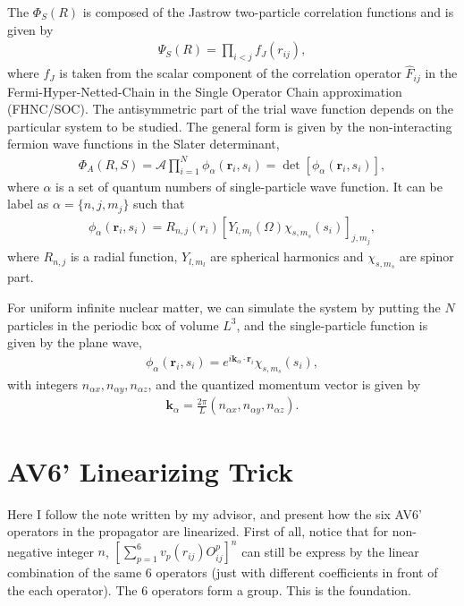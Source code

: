 \documentclass[12pt,letterpaper,UTF8]{report}
\begin{document}
{The $\Phi_S(R)$ is composed of the Jastrow two-particle correlation functions and is given by
\begin{eqnarray}
\Psi_S(R) = \prod_{i<j} f_J(r_{ij}),
\end{eqnarray}
where $f_J$ is taken from the scalar component of the correlation operator $\hat{F}_{ij}$ in the Fermi-Hyper-Netted-Chain in the Single Operator Chain approximation (FHNC/SOC).
The antisymmetric part of the trial wave function depends on the particular system to be studied.
The general form is given by the non-interacting fermion wave functions in the Slater determinant,
\begin{eqnarray}
\Phi_A(R,S)=\mathcal{A} \prod_{i=1}^N \phi_\alpha(\bm{r}_i,s_i)=\det[\phi_\alpha(\bm{r}_i,s_i)],
\end{eqnarray}
where $\alpha$ is a set of quantum numbers of single-particle wave function. It can be label as $\alpha=\{n,j,m_j\}$ such that
\begin{eqnarray} \phi_\alpha(\bm{r}_i,s_i) = R_{n,j}(r_i)[Y_{l,m_l}(\Omega)\chi_{s,m_s}(s_i)]_{j,m_j},
\end{eqnarray}
where $R_{n,j}$ is a radial function, $Y_{l,m_l}$ are spherical harmonics and $\chi_{s,m_s}$ are spinor part.

For uniform infinite nuclear matter, we can simulate the system by putting the $N$ particles in the periodic box of volume $L^3$, and the single-particle function is given by the plane wave,
\begin{eqnarray}
\phi_\alpha(\bm{r}_i,s_i) = e^{i \bm{k}_\alpha \cdot \bm{r}_i} \chi_{s,m_s}(s_i),
\end{eqnarray}
with integers $n_{\alpha x}, n_{\alpha y}, n_{\alpha z}$, and the quantized momentum vector is given by
\begin{eqnarray}
\bm{k}_{\alpha}=\frac{2\pi}{L}(n_{\alpha x}, n_{\alpha y}, n_{\alpha z}).
\end{eqnarray}


\chapter{AV6' Linearizing Trick}
\label{secAV6'linear}
\clearpage

Here I follow the note written by my advisor, and present how the six AV6' operators in the propagator are linearized.
First of all, notice that for non-negative integer $n$, $\left[\sum_{p=1}^6 v_p(r_{ij}) O_{ij}^p\right]^n$ can still be express by the linear combination of the same 6 operators (just with different coefficients in front of the each operator). The 6 operators form a group. This is the foundation.

}
\end{document}
